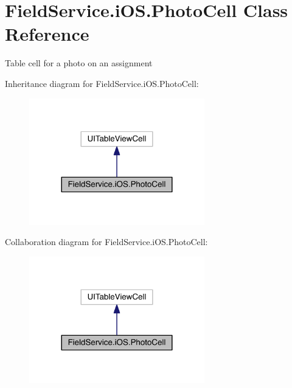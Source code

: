 \hypertarget{class_field_service_1_1i_o_s_1_1_photo_cell}{\section{Field\+Service.\+i\+O\+S.\+Photo\+Cell Class Reference}
\label{class_field_service_1_1i_o_s_1_1_photo_cell}
}


Table cell for a photo on an assignment  




Inheritance diagram for Field\+Service.\+i\+O\+S.\+Photo\+Cell\+:
\nopagebreak
\begin{figure}[H]
\begin{center}
\leavevmode
\includegraphics[width=216pt]{class_field_service_1_1i_o_s_1_1_photo_cell__inherit__graph}
\end{center}
\end{figure}


Collaboration diagram for Field\+Service.\+i\+O\+S.\+Photo\+Cell\+:
\nopagebreak
\begin{figure}[H]
\begin{center}
\leavevmode
\includegraphics[width=216pt]{class_field_service_1_1i_o_s_1_1_photo_cell__coll__graph}
\end{center}
\end{figure}
